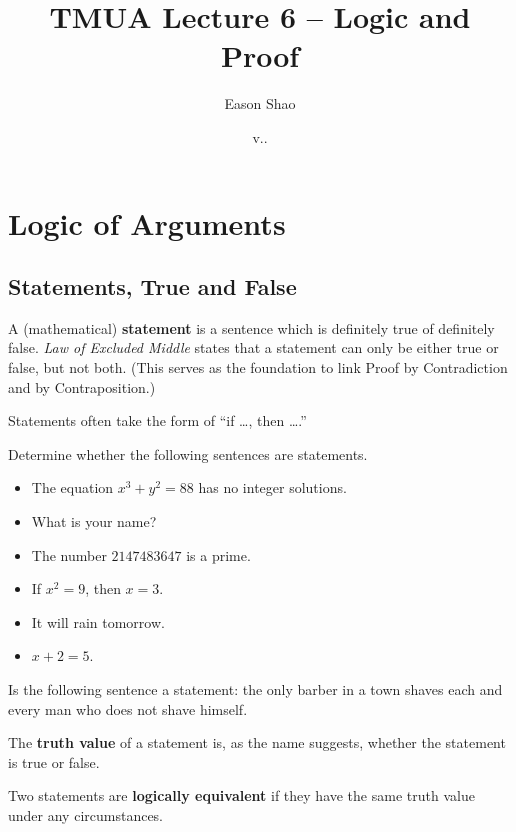 \documentclass{article}
\title{TMUA Lecture 6 -- Logic and Proof}
\author{Eason Shao}
\date{v.\DATE.\COMMITSHA}
\begin{document}
\maketitle

\tableofcontents

\section{Logic of Arguments}

\subsection{Statements, True and False}

A (mathematical) \textbf{statement} is a sentence which is definitely true of definitely false. \textit{Law of Excluded Middle} states that a statement can only be either true or false, but not both. (This serves as the foundation to link Proof by Contradiction and by Contraposition.)

Statements often take the form of ``if \dots, then \dots.''

\begin{example}
    Determine whether the following sentences are statements.
    \begin{itemize}
        \item The equation \(x^3 + y^2 = 88\) has no integer solutions.
        \item What is your name?
        \item The number \(2147483647\) is a prime.
        \item If \(x^2 = 9\), then \(x = 3\).
        \item It will rain tomorrow.
        \item \(x + 2 = 5\).
    \end{itemize}
\end{example}

\begin{problem}
    Is the following sentence a statement: the only barber in a town shaves each and every man who does not shave himself.
\end{problem}

The \textbf{truth value} of a statement is, as the name suggests, whether the statement is true or false.

Two statements are \textbf{logically equivalent} if they have the same truth value under any circumstances.
\end{document}
